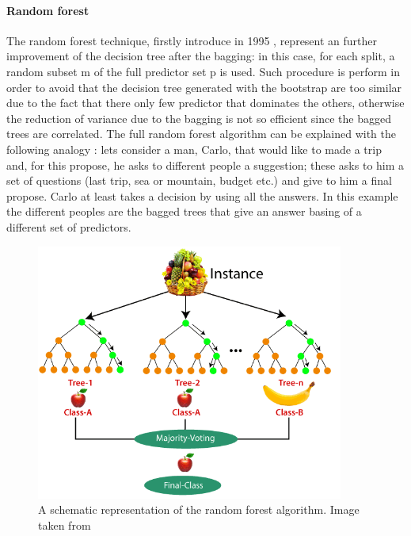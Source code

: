 \documentclass[
12pt, %
a4paper, %
oneside, %
headinclude,footinclude, %
BCOR5mm, %
]{scrartcl}
\begin{document}
\paragraph{Random forest} 
The random forest technique, firstly introduce in 1995 \cite{ho1995random}, represent an further improvement of the decision tree after the bagging: in this case, for each split, a random subset m of the full predictor set p is used. Such procedure is perform in order to avoid that the decision tree generated with the bootstrap are too similar due to the fact that there only few predictor that dominates the others, otherwise the reduction of variance due to the bagging is not so efficient since the bagged trees are correlated. The full random forest algorithm can be explained with the following analogy \cite{rand_for_exp}: lets consider a man, Carlo,  that would like to made a trip and, for this propose,  he asks to different people a suggestion; these asks to him a set of questions (last trip, sea or mountain, budget etc.) and give to him a final propose. Carlo at least takes a decision by using all the answers. In this example the different peoples are the bagged trees that give an answer basing of a different set of predictors. 
\begin{figure}[h]
\begin{center}
\includegraphics[width=0.9\textwidth]{Pic/random-forest-algorithm2.png}
\caption{A schematic representation of the random forest algorithm. Image taken from \cite{rand_for_fig}}
\label{Noisy_channel}
\end{center}
\end{figure}
\end{document}
